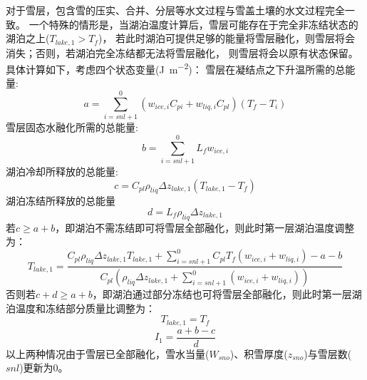 对于雪层，包含雪的压实、合并、分层等水文过程与雪盖土壤的水文过程完全一致。
一个特殊的情形是，当湖泊温度计算后，雪层可能存在于完全非冻结状态的湖泊之上($T_{lake,1}>T_f$)，
若此时湖泊可提供足够的能量将雪层融化，则雪层将会消失；否则，若湖泊完全冻结都无法将雪层融化，
则雪层将会以原有状态保留。具体计算如下，考虑四个状态变量(\unit{J.m^{-2}})：
雪层在凝结点之下升温所需的总能量:
\begin{equation}
a=\sum_{i=s n l+1}^{0}\left(w_{ice, i} C_{p i}+w_{liq, i} C_{p l}\right)\left(T_{f}-T_{i}\right)
\end{equation}
雪层固态水融化所需的总能量:
\begin{equation}
b=\sum_{i=s n l+1}^{0} L_{f} w_{ice, i}
\end{equation}
湖泊冷却所释放的总能量:
\begin{equation}
c=C_{p l} \rho_{liq} \Delta z_{lake, 1}\left(T_{lake, 1}-T_{f}\right)
\end{equation}
湖泊冻结所释放的总能量
\begin{equation}
    d=L_{f} \rho_{liq} \Delta z_{lake, 1}
\end{equation}
若$c\geqslant a+b$，即湖泊不需冻结即可将雪层全部融化，则此时第一层湖泊温度调整为：
\begin{equation}
T_{lake, 1}=\frac{C_{p l} \rho_{liq} \Delta z_{lake, 1} T_{lake, 1}+\sum_{i=s n l+1}^{0} C_{p l}
 T_{f}\left(w_{ice, i}+w_{liq, i}\right)-a-b}{C_{p l}\left(\rho_{liq} \Delta z_{lake, 1}+\sum_{i=s n l+1}^{0}
 \left(w_{ice, i}+w_{liq, i}\right)\right)}
\end{equation}
否则若$c+d\geqslant a+b$，即湖泊通过部分冻结也可将雪层全部融化，则此时第一层湖泊温度和冻结部分质量比调整为：
\begin{equation}
T_{lake, 1}=T_{f}
\end{equation}
\begin{equation}
I_{1}=\frac{a+b-c}{d}
\end{equation}
以上两种情况由于雪层已全部融化，雪水当量($W_{sno}$)、积雪厚度($z_{sno}$)与雪层数($snl$)更新为0。